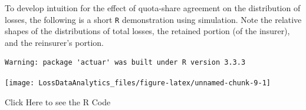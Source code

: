 \documentclass[]{book}
\newenvironment{Shaded}{\begin{snugshade}}{\end{snugshade}}
\newcommand{\KeywordTok}[1]{\textcolor[rgb]{0.13,0.29,0.53}{\textbf{{#1}}}}
\newcommand{\DataTypeTok}[1]{\textcolor[rgb]{0.13,0.29,0.53}{{#1}}}
\newcommand{\DecValTok}[1]{\textcolor[rgb]{0.00,0.00,0.81}{{#1}}}
\newcommand{\FloatTok}[1]{\textcolor[rgb]{0.00,0.00,0.81}{{#1}}}
\newcommand{\StringTok}[1]{\textcolor[rgb]{0.31,0.60,0.02}{{#1}}}
\newcommand{\NormalTok}[1]{{#1}}
\theoremstyle{definition}
\theoremstyle{definition}
\theoremstyle{definition}
\theoremstyle{remark}
\begin{document}
To develop intuition for the effect of quota-share agreement on the
distribution of losses, the following is a short \texttt{R}
demonstration using simulation. Note the relative shapes of the
distributions of total losses, the retained portion (of the insurer),
and the reinsurer's portion.

\begin{verbatim}
Warning: package 'actuar' was built under R version 3.3.3
\end{verbatim}

\begin{center}\texttt{[image: LossDataAnalytics\_files/figure-latex/unnamed-chunk-9-1]} \end{center}

Click Here to see the R Code

\hypertarget{toggleQuotaShare}{}
\begin{Shaded}
\end{Shaded}
\end{document}
